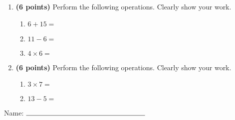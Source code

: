\documentclass[12pt]{amsart}
\begin{document}
\newpage
\begin{enumerate}
\item {\bf (6 points)} 
 Perform the following operations. Clearly show your work. \begin{enumerate}


\def \a{6}\def \b{15}\def \apb{21}

 
\item $\a + \b = $

\vspace{2cm}
\def \a{11}\def \dif{5}\def \b{6}

 
\item $\a - \b = $

\vspace{2cm}
\def \a{4}\def \b{6}\def \ab{10}

 
\item $\a \times \b = $ 

\vspace{2cm}
\def \vshift{-3}\def \hshift{-4}\def \chang{-2}\def \findval{-6}\def \yval{1}

 
\end{enumerate}


\newpage
\item {\bf (6 points)} 
 Perform the following operations. Clearly show your work. \begin{enumerate}


\def \a{3}\def \b{7}\def \ab{10}

 
\item $\a \times \b = $ 

\vspace{2cm}
\def \a{13}\def \dif{8}\def \b{5}

 
\item $\a - \b = $

\vspace{2cm}
\def \vshift{1}\def \hshift{-4}\def \chang{-2}\def \findval{-6}\def \yval{5}

 
\end{enumerate}


\newpage\end{enumerate}\graphicspath{{C:/Users/iainc/anaconda3/Randomizer/Sample Course/Sample Assessment 2/}}\setcounter{page}{1}


\thispagestyle{fancy}

 
\noindent Name: $\rule{6cm}{0.15mm}$

\vspace{.2cm}
\end{document}
